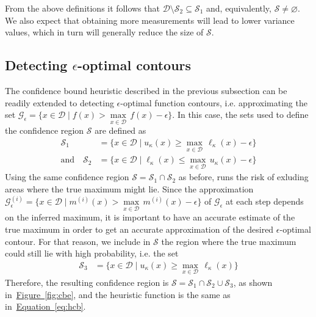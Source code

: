 \documentclass[11pt]{article} %
\newcommand{\figref}[1]{\hyperref[#1]{\mbox{Figure~\ref*{#1}}}}
\newcommand{\eqtref}[1]{\hyperref[#1]{\mbox{Equation~\ref*{#1}}}}
\begin{document}
From the above definitions it follows that 
$\mathcal{D}\setminus\mathcal{S}_2\subseteq\mathcal{S}_1$
and, equivalently, $\mathcal{S}\neq\varnothing$. We also expect that
obtaining more measurements will lead to lower variance values, which in turn
will generally reduce the size of $\mathcal{S}$.

\subsection{Detecting $\epsilon$-optimal contours}
The confidence bound heuristic described in the previous subsection can be
readily extended to detecting $\epsilon$-optimal function contours,
i.e. approximating the set
${\mathcal{G}_{\epsilon} = \{x \in \mathcal{D} \mid f(x) > \underset{x \in \mathcal{D}}{\max}\,f(x) - \epsilon\}}$.
In this case, the sets used to define the confidence region $\mathcal{S}$
are defined as
\begin{align*}
  \mathcal{S}_1 &= \{x \in \mathcal{D} \mid u_{\kappa}(x) \geq \underset{x \in \mathcal{D}}{\max}\,\ell_{\kappa}(x) - \epsilon\}\\
  \text{and}\hspace{1em}
  \mathcal{S}_2 &= \{x \in \mathcal{D} \mid \ell_{\kappa}(x) \leq \underset{x \in \mathcal{D}}{\max}\,u_{\kappa}(x) - \epsilon\}
\end{align*}
Using the same confidence region $\mathcal{S} = \mathcal{S}_1\cap\mathcal{S}_2$
as before, runs the risk of exluding areas where the true maximum might lie.
Since the approximation
${\mathcal{G}^{(i)}_\epsilon = \{x \in \mathcal{D} \mid m^{(i)}(x) > \underset{x \in \mathcal{D}}{\max}\,m^{(i)}(x) - \epsilon\}}$
of $\mathcal{G}_{\epsilon}$ at each step
depends on the inferred maximum, it is important to have an accurate estimate
of the true maximum in order to get an accurate approximation of the desired
$\epsilon$-optimal contour. For that reason, we include in $\mathcal{S}$ the
region where the true maximum could still lie with high probability, i.e.
the set
\begin{align*}
  \mathcal{S}_3 &= \{x \in \mathcal{D} \mid u_{\kappa}(x) \geq \underset{x \in \mathcal{D}}{\max}\,\ell_{\kappa}(x)\}
\end{align*}
Therefore, the resulting confidence region is
$\mathcal{S} = \mathcal{S}_1\cap\mathcal{S}_2\cup\mathcal{S}_3$, as shown
in~\figref{fig:cbe}, and the heuristic function is the same as
in~\eqtref{eq:hcb}.
\end{document}
